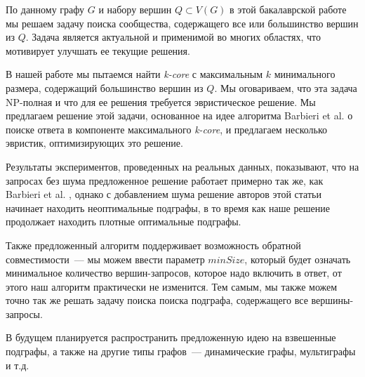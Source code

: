 \startconclusionpage

По данному графу $G$ и набору вершин $Q \subset V(G)$ в этой бакалаврской работе мы решаем задачу поиска сообщества, содержащего все или большинство вершин из $Q$. Задача является актуальной и применимой во многих областях, что мотивирует улучшать ее текущие решения.

В нашей работе мы пытаемся найти \textit{k-core} с максимальным $k$ минимального размера, содержащий большинство вершин из $Q$. Мы оговариваем, что эта задача NP-полная и что для ее решения требуется эвристическое решение. Мы предлагаем решение этой задачи, основанное на идее алгоритма Barbieri et al. \cite{Barbieri15} о поиске ответа в компоненте максимального \textit{k-core}, и предлагаем несколько эвристик, оптимизирующих это решение. 

Результаты экспериментов, проведенных на реальных данных, показывают, что на запросах без шума предложенное решение работает примерно так же, как Barbieri et al. \cite{Barbieri15}, однако с добавлением шума решение авторов этой статьи начинает находить неоптимальные подграфы, в то время как наше решение продолжает находить плотные оптимальные подграфы.

Также предложенный алгоритм поддерживает возможность обратной совместимости~--- мы можем ввести параметр $minSize$, который будет означать минимальное количество вершин-запросов, которое надо включить в ответ, от этого наш алгоритм практически не изменится. Тем самым, мы также можем точно так же решать задачу поиска поиска подграфа, содержащего все вершины-запросы.

В будущем планируется распространить предложенную идею на взвешенные подграфы, а также на другие типы графов~--- динамические графы, мультиграфы и т.д.
